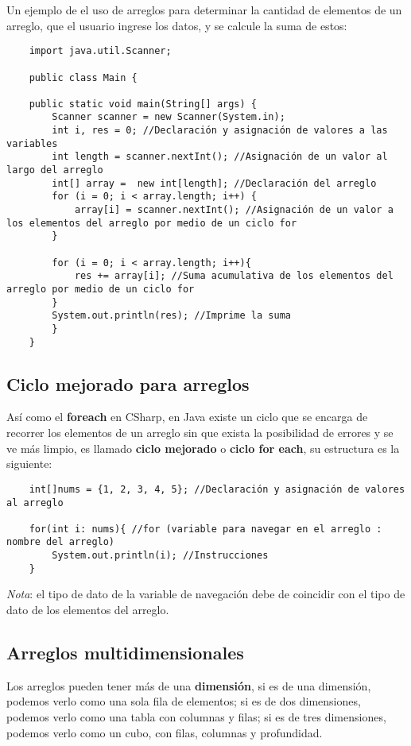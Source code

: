 Un ejemplo de el uso de arreglos para determinar la cantidad de elementos de un arreglo, que el usuario ingrese los datos, y se calcule la suma de estos:
\begin{lstlisting}
    import java.util.Scanner;

    public class Main {

    public static void main(String[] args) {
        Scanner scanner = new Scanner(System.in);
        int i, res = 0; //Declaración y asignación de valores a las variables
        int length = scanner.nextInt(); //Asignación de un valor al largo del arreglo
        int[] array =  new int[length]; //Declaración del arreglo
        for (i = 0; i < array.length; i++) {
            array[i] = scanner.nextInt(); //Asignación de un valor a los elementos del arreglo por medio de un ciclo for
        }

        for (i = 0; i < array.length; i++){
            res += array[i]; //Suma acumulativa de los elementos del arreglo por medio de un ciclo for
        }
        System.out.println(res); //Imprime la suma
        }
    }
\end{lstlisting}


\subsection{Ciclo mejorado para arreglos}
\hspace{0.55cm}Así como el \textbf{foreach} en CSharp, en Java existe un ciclo que se encarga de recorrer los elementos de un arreglo sin que exista la posibilidad de errores y se ve más limpio, es llamado \textbf{ciclo mejorado} o \textbf{ciclo for each}, su estructura es la siguiente:
\begin{lstlisting}
    int[]nums = {1, 2, 3, 4, 5}; //Declaración y asignación de valores al arreglo
        
    for(int i: nums){ //for (variable para navegar en el arreglo : nombre del arreglo)
        System.out.println(i); //Instrucciones
    }
\end{lstlisting}

\textit{Nota}: el tipo de dato de la variable de navegación debe de coincidir con el tipo de dato de los elementos del arreglo.


\subsection{Arreglos multidimensionales}
\hspace{0.55cm}Los arreglos pueden tener más de una \textbf{dimensión}, si es de una dimensión, podemos verlo como una sola fila de elementos; si es de dos dimensiones, podemos verlo como una tabla con columnas y filas; si es de tres dimensiones, podemos verlo como un cubo, con filas, columnas y profundidad.

